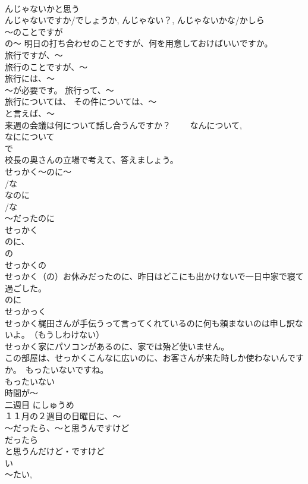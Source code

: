 \documentclass[8pt]{extreport}
\begin{document}
\begin{CJK}{UTF8}{min}
\\	んじゃないかと思う 
\\	んじゃないですか/でしょうか, んじゃない？, んじゃないかな/かしら 
\\	～のことですが	
\\	の～ 明日の打ち合わせのことですが、何を用意しておけばいいですか。 
\\	旅行ですが、～　
\\	旅行のことですが、～　
\\	旅行には、～ 
\\	～が必要です。 旅行って、～ 
\\	旅行については、 その件については、～ 
\\	と言えば、～ 
\\	来週の会議は何について話し合うんですか？　　 なんについて, 
\\	なにについて 
\\	で 
\\	校長の奥さんの立場で考えて、答えましょう。
\\	せっかく～のに～	
\\	/な
\\	なのに 
\\	/な
\\	～だったのに 
\\	せっかく
\\	のに、
\\	の 
\\	せっかくの
\\	せっかく（の）お休みだったのに、昨日はどこにも出かけないで一日中家で寝て過ごした。 
\\	のに 
\\	せっかっく 
\\	せっかく梶田さんが手伝うって言ってくれているのに何も頼まないのは申し訳ないよ。　（もうしわけない） 
\\	せっかく家にパソコンがあるのに、家では殆ど使いません。 
\\	この部屋は、せっかくこんなに広いのに、お客さんが来た時しか使わないんですか。　もったいないですね。 
\\	もったいない 
\\	時間が～
\\	二週目	にしゅうめ 
\\	１１月の２週目の日曜日に、～
\\	～だったら、～と思うんですけど	
\\	だったら 
\\	と思うんだけど・ですけど 
\\	い
\\	～たい, 

\end{CJK}
\end{document}
